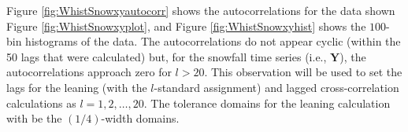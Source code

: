 
Figure \ref{fig:WhistSnowxyautocorr} shows the autocorrelations for the data shown Figure \ref{fig:WhistSnowxyplot}, and Figure \ref{fig:WhistSnowxyhist} shows the $100$-bin histograms of the data.  The autocorrelations do not appear cyclic (within the 50 lags that were calculated) but, for the snowfall time series (i.e., $\mathbf{Y}$), the autocorrelations approach zero for $l>20$.  This observation will be used to set the lags for the leaning (with the $l$-standard assignment) and lagged cross-correlation calculations as $l=1,2,\ldots,20$.  The tolerance domains for the leaning calculation with be the $(1/4)$-width domains.

